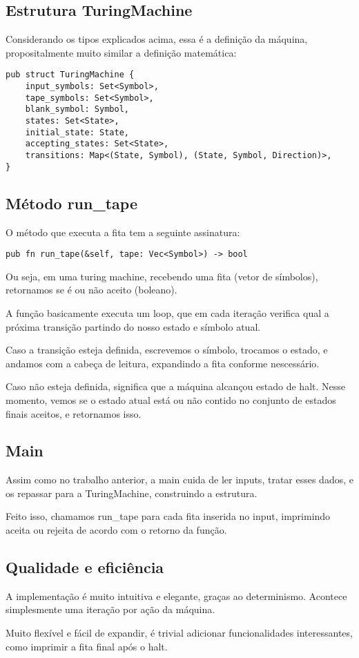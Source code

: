 \documentclass[12pt]{article}
\begin{document}
\subsection{Estrutura TuringMachine}

Considerando os tipos explicados acima, essa é a definição da máquina, propositalmente muito similar a definição matemática:

\begin{verbatim}
pub struct TuringMachine {
    input_symbols: Set<Symbol>,
    tape_symbols: Set<Symbol>,
    blank_symbol: Symbol,
    states: Set<State>,
    initial_state: State,
    accepting_states: Set<State>,
    transitions: Map<(State, Symbol), (State, Symbol, Direction)>,
}
\end{verbatim}

\subsection{Método run\_tape}

O método que executa a fita tem a seguinte assinatura:
\begin{verbatim}
pub fn run_tape(&self, tape: Vec<Symbol>) -> bool
\end{verbatim}

Ou seja, em uma turing machine, recebendo uma fita (vetor de símbolos), retornamos se é ou não aceito (boleano).

A função basicamente executa um loop, que em cada iteração verifica qual a próxima transição partindo do nosso estado e símbolo atual.

Caso a transição esteja definida, escrevemos o símbolo, trocamos o estado, e andamos com a cabeça de leitura, expandindo a fita conforme nescessário.

Caso não esteja definida, significa que a máquina alcançou estado de halt. Nesse momento, vemos se o estado atual está ou não contido no conjunto de estados finais aceitos, e retornamos isso.

\subsection{Main}

Assim como no trabalho anterior, a main cuida de ler inputs, tratar esses dados, e os repassar para a TuringMachine, construindo a estrutura.

Feito isso, chamamos run\_tape para cada fita inserida no input, imprimindo aceita ou rejeita de acordo com o retorno da função.

\subsection{Qualidade e eficiência}
A implementação é muito intuitiva e elegante, graças ao determinismo. Acontece simplesmente uma iteração por ação da máquina.

Muito flexível e fácil de expandir, é trivial adicionar funcionalidades interessantes, como imprimir a fita final após o halt.
\end{document}
